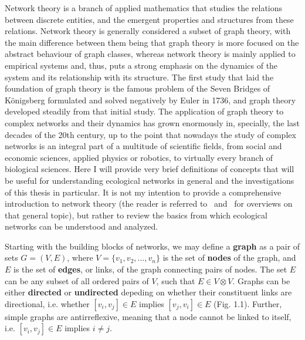 Network theory is a branch of applied mathematics that studies the relations between discrete entities, and the emergent properties and structures from these relations. Network theory is generally considered a subset of graph theory, with the main difference between them being that graph theory is more focused on the abstract behaviour of graph classes, whereas network theory is mainly applied to empirical systems and, thus, puts a strong emphasis on the dynamics of the system and its relationship with its structure. The first study that laid the foundation of graph theory is the famous problem of the Seven Bridges of Königsberg formulated and solved negatively by Euler in 1736, and graph theory developed steadily from that initial study. The application of graph theory to complex networks and their dynamics has grown enormously in, specially, the last decades of the 20th century, up to the point that nowadays the study of complex networks is an integral part of a multitude of scientific fields, from social and economic sciences, applied physics or robotics, to virtually every branch of biological sciences. Here I will provide very brief definitions of concepts that will be useful for understanding ecological networks in general and the investigations of this thesis in particular. It is not my intention to provide a comprehensive introduction to network theory (the reader is referred to~\cite{Newman2010} and~\cite{Barabasi2016} for overviews on that general topic), but rather to review the basics from which ecological networks can be understood and analyzed.


Starting with the building blocks of networks, we may define a \textbf{graph} as a pair of sets $G = (V,E)$, where $V = \{v_1,v_2,...,v_n\}$ is the set of \textbf{nodes} of the graph, and $E$ is the set of \textbf{edges}, or links, of the graph connecting pairs of nodes. The set $E$ can be any subset of all ordered pairs of $V$, such that $E \in V \otimes V$. Graphs can be either \textbf{directed} or \textbf{undirected} depeding on whether their constituent links are directional, i.e. whether $[v_i,v_j] \in E$ implies $[v_j,v_i] \in E$ (Fig. 1.1). Further, simple graphs are antirreflexive, meaning that a node cannot be linked to itself, i.e. $[v_i,v_j] \in E$ implies $i \neq j$.

